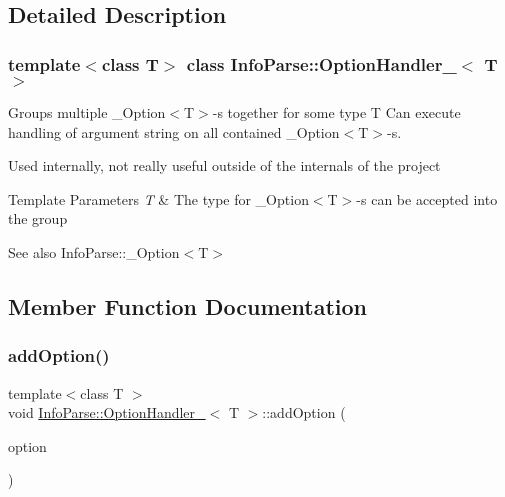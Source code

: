 \subsection{Detailed Description}
\subsubsection*{template$<$class T$>$\newline
class Info\+Parse\+::\+Option\+Handler\+\_\+$<$ T $>$}

Groups multiple \+\_\+\+Option$<$\+T$>$-\/s together for some type T Can execute handling of argument string on all contained \+\_\+\+Option$<$\+T$>$-\/s.

Used internally, not really useful outside of the internals of the project


\begin{DoxyTemplParams}{Template Parameters}
{\em T}
    & The type for \+\_\+\+Option$<$\+T$>$-\/s can be accepted into the group\\
    \hline
\end{DoxyTemplParams}
\begin{DoxySeeAlso}{See also}
    Info\+Parse\+::\+\_\+\+Option$<$\+T$>$
\end{DoxySeeAlso}


\subsection{Member Function Documentation}
\mbox{\label{class_info_parse_1_1_option_handler___a665e15d0113596904ed969b1d1c9be4a}}
\subsubsection{\texorpdfstring{addOption()}{addOption()}\hspace{0.1cm}{\footnotesize\ttfamily [1/3]}}
{\footnotesize\ttfamily template$<$class T $>$ \\
void \mbox{\hyperlink{class_info_parse_1_1_option_handler__}{Info\+Parse\+::\+Option\+Handler\+\_\+}}$<$ T $>$\+::add\+Option (\begin{DoxyParamCaption}
                                                                                                                                   \item[{\mbox{\hyperlink{class_info_parse_1_1_option__}{Option\+\_\+}}$<$ T $>$ \&\&}]{option }
\end{DoxyParamCaption})}



